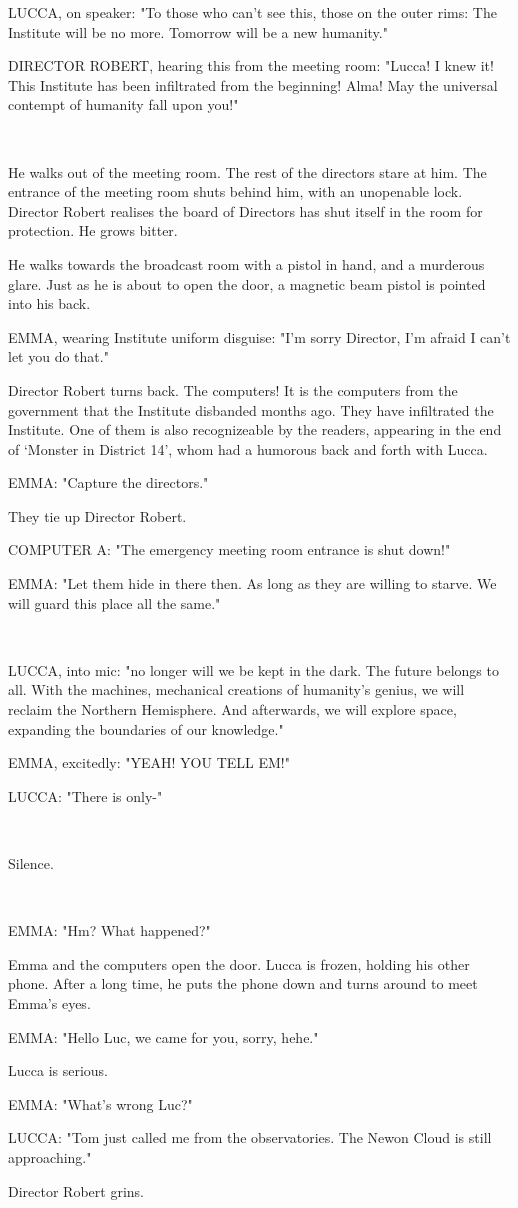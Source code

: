 \documentclass[11pt]{article}
\begin{document}
LUCCA, on speaker: "To those who can't see this, those on the outer rims: 
The Institute will be no more.
Tomorrow will be a new humanity."

DIRECTOR ROBERT, hearing this from the meeting room: "Lucca! 
I knew it! This Institute has been infiltrated from the beginning!
Alma! 
May the universal contempt of humanity fall upon you!"

\ 

He walks out of the meeting room. 
The rest of the directors stare at him.
The entrance of the meeting room shuts behind him, with an unopenable lock. 
Director Robert realises the board of Directors has shut itself in the room for protection. He grows bitter.

He walks towards the broadcast room with a pistol in hand, and a murderous glare. 
Just as he is about to open the door, a magnetic beam pistol is pointed into his back.

EMMA, wearing Institute uniform disguise: "I'm sorry Director, I'm afraid I can't let you do that."

Director Robert turns back. 
The computers!
It is the computers from the government that the Institute disbanded months ago. 
They have infiltrated the Institute. 
One of them is also recognizeable by the readers, appearing in the end of `Monster in District 14', whom had a humorous back and forth with Lucca.

EMMA: "Capture the directors."

They tie up Director Robert.

COMPUTER A: "The emergency meeting room entrance is shut down!"

EMMA: "Let them hide in there then. 
As long as they are willing to starve.
We will guard this place all the same."

\ 

LUCCA, into mic: "no longer will we be kept in the dark.
The future belongs to all.
With the machines, mechanical creations of humanity's genius, we will reclaim the Northern Hemisphere.
And afterwards, we will explore space, expanding the boundaries of our knowledge."

EMMA, excitedly: "YEAH! YOU TELL EM!"

LUCCA: "There is only-"

\ 

Silence.

\ 

EMMA: "Hm? What happened?"

Emma and the computers open the door.
Lucca is frozen, holding his other phone.
After a long time, he puts the phone down and turns around to meet Emma's eyes.

EMMA: "Hello Luc, we came for you, sorry, hehe."

Lucca is serious.

EMMA: "What's wrong Luc?"

LUCCA: "Tom just called me from the observatories. 
The Newon Cloud is still approaching."

Director Robert grins.
\end{document}
